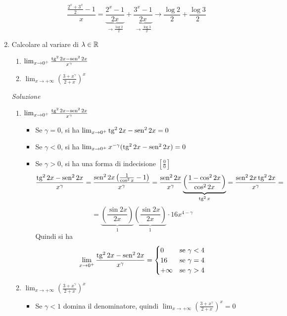 \documentclass{article}
\begin{document}
\begin{enumerate}[label=\textbf{Esercizio 6.\arabic*.},itemindent=*]
\begin{enumerate}
        \[\frac{\frac{2^x+3^x}{2}-1}{x}=\underbrace{\frac{2^x-1}{2x}}_{\to\frac{\log2}{2}}+\underbrace{\frac{3^x-1}{2x}}_{\to\frac{\log3}{2}}\to \frac{\log2}{2}+\frac{\log3}{2}\]
    \end{enumerate}
    \item Calcolare al variare di $\lambda\in \mathbb{R}$
    \begin{enumerate}
        \item $\lim_{x\to 0^+}\frac{\operatorname{tg}^22x-\operatorname{sen}^22x}{x^\gamma}$
        \item $\lim_{x\to +\infty}\left( \frac{3+x^\gamma}{2+x} \right)^x$
    \end{enumerate}
    \item[\textit{\large Soluzione~}]~
    \begin{enumerate}
        \item $\lim_{x\to 0^+}\frac{\operatorname{tg}^22x-\operatorname{sen}^22x}{x^\gamma}$
        \begin{itemize}
            \item Se $\gamma=0$, si ha $\lim_{x\to 0^+}{\operatorname{tg}^22x-\operatorname{sen}^22x}=0$
            \item Se $\gamma<0$, si ha $\lim_{x\to 0^+}{x^{-\gamma}(\operatorname{tg}^22x-\operatorname{sen}^22x)}=0$
            \item Se $\gamma>0$, si ha una forma di indecisione $\left[ \frac{0}{0} \right]$
            \[
                \frac{\operatorname{tg}^22x-\operatorname{sen}^22x}{x^\gamma}=\frac{\operatorname{sen}^22x\left( \frac{1}{\cos^2x}-1 \right)}{x^\gamma}=\frac{\operatorname{sen}^22x}{x^\gamma}\underbrace{\left( \frac{1-\cos^22x}{\cos^22x} \right)}_{\operatorname{tg}^2 x}=\frac{\operatorname{sen}^22x\operatorname{tg}^22x}{x^\gamma}=
            \]
            \[
                =\underbrace{\left( \frac{\sin2x}{2x} \right)}_1\underbrace{\left( \frac{\sin2x}{2x}\right)}_1\cdot 16x^{4-\gamma}
            \]
            Quindi si ha
            \[\lim_{x\to 0^+}\frac{\operatorname{tg}^22x-\operatorname{sen}^22x}{x^\gamma}=\begin{cases}
                0&\text{se }\gamma<4\\
                16&\text{se }\gamma=4\\
                +\infty&\text{se }\gamma >4\\
            \end{cases}\]
        \end{itemize}
        \item $\lim_{x\to +\infty}\left( \frac{3+x^\gamma}{2+x} \right)^x$
        \begin{itemize}
            \item Se $\gamma<1$ domina il denominatore, quindi $\lim_{x\to +\infty}\left( \frac{3+x^\gamma}{2+x} \right)^x=0$

\end{itemize}
\end{enumerate}
\end{enumerate}
\end{document}
